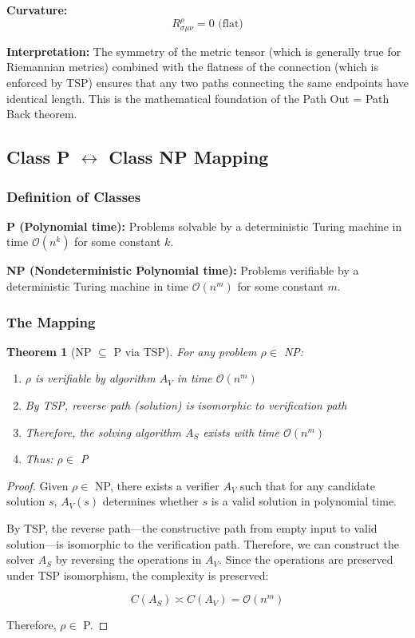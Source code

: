 \documentclass[11pt, letterpaper]{article}
\newtheorem{theorem}{Theorem}[section]
\begin{document}
\textbf{Curvature:}
\begin{equation}
R^\rho_{\sigma\mu\nu} = 0 \text{ (flat)}
\end{equation}

\textbf{Interpretation:} The symmetry of the metric tensor (which is generally true for Riemannian metrics) combined with the flatness of the connection (which is enforced by TSP) ensures that any two paths connecting the same endpoints have identical length. This is the mathematical foundation of the Path Out = Path Back theorem.

\subsection{\texorpdfstring{Class P $\leftrightarrow$ Class NP Mapping}{Class P <-> Class NP Mapping}}

\subsubsection{Definition of Classes}

\textbf{P (Polynomial time):} Problems solvable by a deterministic Turing machine in time $\mathcal{O}(n^k)$ for some constant $k$.

\textbf{NP (Nondeterministic Polynomial time):} Problems verifiable by a deterministic Turing machine in time $\mathcal{O}(n^m)$ for some constant $m$.

\subsubsection{The Mapping}

\begin{theorem}[NP $\subseteq$ P via TSP]
For any problem $\rho \in$ NP:
\begin{enumerate}
    \item $\rho$ is verifiable by algorithm $A_V$ in time $\mathcal{O}(n^m)$
    \item By TSP, reverse path (solution) is isomorphic to verification path
    \item Therefore, the solving algorithm $A_S$ exists with time $\mathcal{O}(n^m)$
    \item Thus: $\rho \in$ P
\end{enumerate}
\end{theorem}

\begin{proof}
Given $\rho \in$ NP, there exists a verifier $A_V$ such that for any candidate solution $s$, $A_V(s)$ determines whether $s$ is a valid solution in polynomial time.

By TSP, the reverse path—the constructive path from empty input to valid solution—is isomorphic to the verification path. Therefore, we can construct the solver $A_S$ by reversing the operations in $A_V$. Since the operations are preserved under TSP isomorphism, the complexity is preserved:

\begin{equation}
C(A_S) \asymp C(A_V) = \mathcal{O}(n^m)
\end{equation}

Therefore, $\rho \in$ P.
\end{proof}
\end{document}
